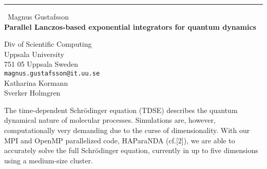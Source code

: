 \documentclass{report}
\begin{document}
\begin{center}
\rule{6in}{1pt} \
{\large Magnus Gustafsson \\
{\bf Parallel Lanczos-based exponential integrators for quantum dynamics}}

Div of Scientific Computing \\ Uppsala University \\ 751 05 Uppsala Sweden
\\
{\tt magnus.gustafsson@it.uu.se}\\
Katharina Kormann\\
Sverker Holmgren\end{center}

The time-dependent Schr{\"o}dinger equation (TDSE) describes the quantum
dynamical nature of molecular processes. Simulations are, however,
computationally very demanding due to the curse of dimensionality. With
our MPI and OpenMP parallelized code, HAParaNDA (cf.[2]), we are able to
accurately solve the full Schr{\"o}dinger equation, currently in up to
five dimensions using a medium-size cluster.
\end{document}
